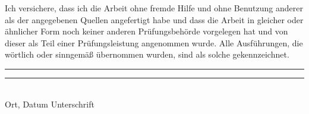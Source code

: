 \documentclass[
11pt, %
ngerman, %
singlespacing, %
liststotoc, %
headsepline, %
]{MastersDoctoralThesis} %
\begin{document}

\begin{declaration}
\noindent Ich versichere, dass ich die Arbeit ohne fremde Hilfe und ohne Benutzung anderer als der angegebenen Quellen angefertigt habe und dass die Arbeit in gleicher oder ähnlicher Form noch keiner anderen Prüfungsbehörde vorgelegen hat und von dieser als Teil einer Prüfungsleistung angenommen wurde. Alle Ausführungen, die wörtlich oder sinngemäß übernommen wurden, sind als solche gekennzeichnet. \\

\vspace{1cm}
\noindent \rule[1em]{15em}{0.5pt} \hfill \rule[1em]{20em}{0.5pt} \\
Ort, Datum \hfill Unterschrift\\
 
\end{declaration}

\cleardoublepage



\begin{abstract}

\end{abstract}
\begin{otherlanguage}{english}
\begin{abstract}

\end{abstract}
\end{otherlanguage}



\end{document}

